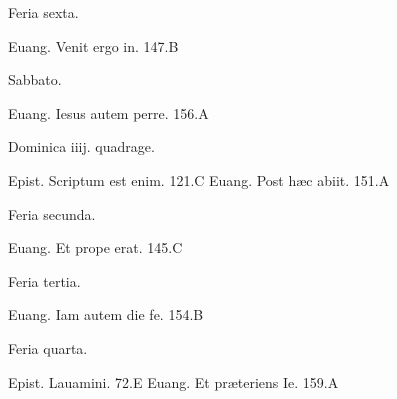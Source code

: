 \documentclass[a5paper,10pt]{book}
\def\ae{æ}
\begin{document}
\begin{multicols}{2}
\newline \vspace{-1.75em}
\begin{center}
\color{red} Feria sexta.
\end{center}
\vspace{-.75em}
\par \noindent Euang. Venit ergo in. \hfill 147.B
\newline \vspace{-1.75em}
\begin{center}
\color{red} Sabbato.
\end{center}
\vspace{-.75em}
\par \noindent Euang. Iesus autem perre. \hfill 156.A
\newline \vspace{-1.75em}
\begin{center}
\color{red} Dominica iiij. quadrage.
\end{center}
\vspace{-.75em}
\par \noindent Epist. Scriptum est enim. \hfill 121.C
\newline Euang. Post h\ae c abiit. \hfill 151.A
\newline \vspace{-1.75em}
\begin{center}
\color{red} Feria secunda.
\end{center}
\vspace{-.75em}
\par \noindent Euang. Et prope erat. \hfill 145.C
\newline \vspace{-1.75em}
\begin{center}
\color{red} Feria tertia.
\end{center}
\vspace{-.75em}
\par \noindent Euang. Iam autem die fe. \hfill 154.B
\newline \vspace{-1.75em}
\begin{center}
\color{red} Feria quarta.
\end{center}
\vspace{-.75em}
\par \noindent Epist. Lauamini. \hfill 72.E
\newline Euang. Et pr\ae teriens Ie. \hfill 159.A
\newline \vspace{-1.75em}

\end{multicols}
\end{document}
